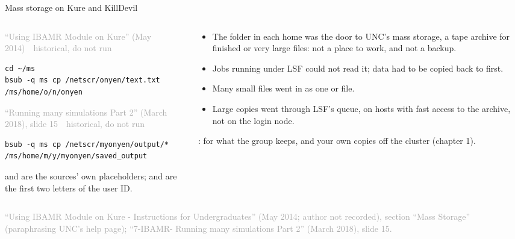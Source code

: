 \documentclass[aspectratio=169,11pt]{beamer}
\newcommand{\sourcecredit}[1]{\vfill\begin{flushright}\tiny\textcolor{DarkGray}{#1}\end{flushright}}
\newcommand{\hist}[1]{{\tiny\sffamily\textcolor{DarkGray}{#1\ \textbullet\ historical, do not run}}\par\nointerlineskip\vspace{0.3mm}}
\begin{document}
\begin{frame}[fragile]{Mass storage on Kure and KillDevil}
\label{fr:ms}
\begin{columns}[T,onlytextwidth]
\begin{column}{0.5\textwidth}
\hist{``Using IBAMR Module on Kure'' (May 2014)}
\begin{lstlisting}[style=hist]
cd ~/ms
bsub -q ms cp /netscr/onyen/text.txt /ms/home/o/n/onyen
\end{lstlisting}
\hist{``Running many simulations Part 2'' (March 2018), slide 15}
\begin{lstlisting}[style=hist]
bsub -q ms cp /netscr/myonyen/output/* /ms/home/m/y/myonyen/saved_output
\end{lstlisting}
\scriptsize {} and  are the sources' own placeholders;  and  are the first two letters of the user ID.
\end{column}
\begin{column}{0.47\textwidth}
\footnotesize
\begin{itemize}\setlength{\itemsep}{2pt}
  \item The  folder in each home was the door to UNC's mass storage, a tape archive for finished or very large files: not a place to work, and not a backup.
  \item Jobs running under LSF could not read it; data had to be copied back to  first.
  \item Many small files went in as one  or  file.
  \item Large copies went through LSF's  queue, on hosts with fast access to the archive, not on the login node.
\end{itemize}
\vspace{1mm}
:  for what the group keeps, and your own copies off the cluster (chapter 1).
\end{column}
\end{columns}
\sourcecredit{``Using IBAMR Module on Kure - Instructions for Undergraduates'' (May 2014; author not recorded), section ``Mass Storage'' (paraphrasing UNC's help page); ``7-IBAMR- Running many simulations Part 2'' (March 2018), slide 15.}
\end{frame}
\end{document}
